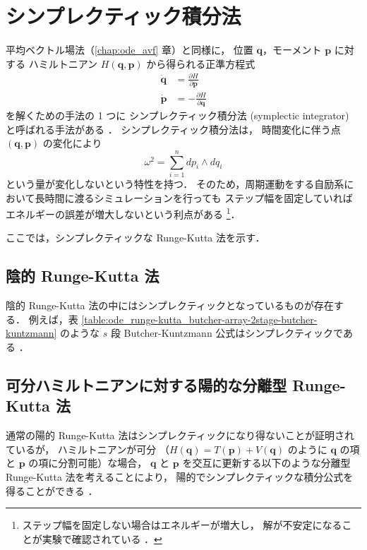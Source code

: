 %

\chapter{シンプレクティック積分法}

平均ベクトル場法（\ref{chap:ode_avf} 章）と同様に，
位置 $\bm{q}$，モーメント $\bm{p}$ に対する
ハミルトニアン $H(\bm{q}, \bm{p})$ から得られる正準方程式
\begin{align}
    \dot{\bm{q}} & = \frac{\partial H}{\partial \bm{p}}  \\
    \dot{\bm{p}} & = -\frac{\partial H}{\partial \bm{q}}
\end{align}
を解くための手法の 1 つに
シンプレクティック積分法 (symplectic integrator) と呼ばれる手法がある
\cite[Section II.16.]{Hairer1993}．
シンプレクティック積分法は，
時間変化に伴う点 $(\bm{q}, \bm{p})$ の変化により
\begin{equation}
    \omega^2 = \sum_{i=1}^{n} dp_i \wedge dq_i
\end{equation}
という量が変化しないという特性を持つ．
そのため，周期運動をする自励系において長時間に渡るシミュレーションを行っても
ステップ幅を固定していればエネルギーの誤差が増大しないという利点がある
\cite{Yoshida2013}
\footnote{ステップ幅を固定しない場合はエネルギーが増大し，%
    解が不安定になることが実験で確認されている%
    \cite[Section II.16.]{Hairer1993}．}．

ここでは，シンプレクティックな Runge-Kutta 法を示す．

\section{陰的 Runge-Kutta 法}

陰的 Runge-Kutta 法の中にはシンプレクティックとなっているものが存在する．
例えば，表 \ref{table:ode_runge-kutta_butcher-array-2stage-butcher-kuntzmann} のような
$s$ 段 Butcher-Kuntzmann 公式はシンプレクティックである
\cite[Section II.16.]{Hairer1993}．

\section{可分ハミルトニアンに対する陽的な分離型 Runge-Kutta 法}

通常の陽的 Runge-Kutta 法はシンプレクティックになり得ないことが証明されているが，
ハミルトニアンが可分
（$H(\bm{q}) = T(\bm{p}) + V(\bm{q})$ のように
$\bm{q}$ の項と $\bm{p}$ の項に分割可能）な場合，
$\bm{q}$ と $\bm{p}$ を交互に更新する以下のような分離型 Runge-Kutta 法を考えることにより，
陽的でシンプレクティックな積分公式を得ることができる
\cite[Section II.16.]{Hairer1993}．

